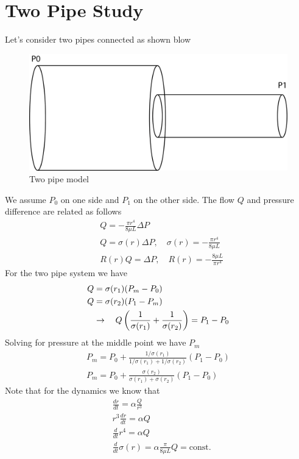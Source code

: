 \section{Two Pipe Study}
%
Let's consider two pipes connected as shown blow
%
\begin{figure}[h]
 \centerline{\includegraphics[width=.4\textwidth]{./Figs/twopipes}}
\caption{Two pipe model}
\label{sup-fig4}
\end{figure}  
%
We assume $P_0$ on one side and $P_1$ on the other side. The flow $Q$
and pressure difference are related as follows
%
\begin{align}
  &Q = -\frac{\pi r^4}{8\mu L} {\Delta P} \\
  &\boxed{Q = \sigma (r) \Delta P, \quad \sigma(r) =   -\frac{\pi r^4}{8\mu L}}\\
  & R(r) Q = \Delta P, \quad R(r) =  -\frac{8\mu L}{\pi r^4}
\end{align}
%
For the two pipe system we have
%
\begin{align}
  Q & = \sigma(r_1) (P_m - P_0) \\
  Q & = \sigma (r_2) (P_1- P_m) \\
  & \to \quad Q \left( \frac{1}{\sigma(r_{1})} + \frac{1}{\sigma(r_{2})}  \right) = P_1 - P_0
\end{align}
%
Solving for pressure at the middle point we have $P_m $
%
\begin{align}
  P_m = P_0 + \frac{{1}/{\sigma(r_{1})} }{{1 }/{\sigma(r_{1})} + {1}/{\sigma(r_{2})} } (P_1 - P_0) \\
  \boxed{P_m = P_0 + \frac{\sigma(r_2)}{\sigma(r_1) + \sigma(r_2)} (P_1 - P_0)}
\end{align}
%
Note that for the dynamics we know that
%
\begin{align}
  & \boxed{\frac{d r}{dt } = \alpha \frac{Q}{r^{3}}}  \\
  & r^3 \frac{d r}{d t}   = \alpha Q \\
  & \frac{d}{dt} r^4 = \alpha Q  \\ 
  & \boxed{\frac{d}{dt} \sigma(r) = \alpha \frac{\pi}{8\mu L} Q = \text{const.}}
\end{align}
%

